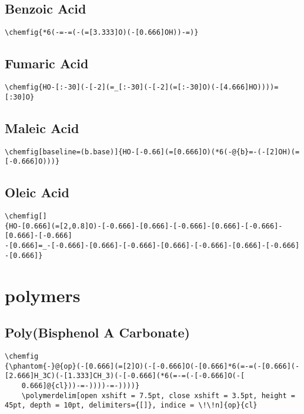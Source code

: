 \section{Benzoic Acid}\label{app:benzoic-acid}
\begin{lstlisting}
\chemfig{*6(-=-=(-(=[3.333]O)(-[0.666]OH))-=)}
\end{lstlisting}


\section{Fumaric Acid}\label{app:fumaric-acid}
\begin{lstlisting}
\chemfig{HO-[:-30](-[-2](=_[:-30](-[-2](=[:-30]O)(-[4.666]HO))))=[:30]O}
\end{lstlisting}


\section{Maleic Acid}\label{app:maleic-acid}
\begin{lstlisting}
\chemfig[baseline=(b.base)]{HO-[-0.66](=[0.666]O)(*6(-@{b}=-(-[2]OH)(=[-0.666]O)))}
\end{lstlisting}


\section{Oleic Acid}\label{app:oleic-acid}
\begin{lstlisting}
\chemfig[]
{HO-[0.666](=[2,0.8]O)-[-0.666]-[0.666]-[-0.666]-[0.666]-[-0.666]-[0.666]-[-0.666]
-[0.666]=_-[-0.666]-[0.666]-[-0.666]-[0.666]-[-0.666]-[0.666]-[-0.666]
-[0.666]}
\end{lstlisting}


\chapter{polymers}\label{app:polymers}


\section{Poly(Bisphenol A Carbonate)}\label{app:poly(bisphenol-a-carbonate)}
\begin{lstlisting}
\chemfig
{\phantom{-}@{op}(-[0.666](=[2]O)(-[-0.666]O(-[0.666]*6(=-=(-[0.666](-[2.666]H_3C)(-[1.333]CH_3)(-[-0.666](*6(=-=(-[-0.666]O(-[
    0.666]@{cl}))-=-))))-=-))))}
    \polymerdelim[open xshift = 7.5pt, close xshift = 3.5pt, height = 45pt, depth = 10pt, delimiters={[]}, indice = \!\!n]{op}{cl}
\end{lstlisting}


